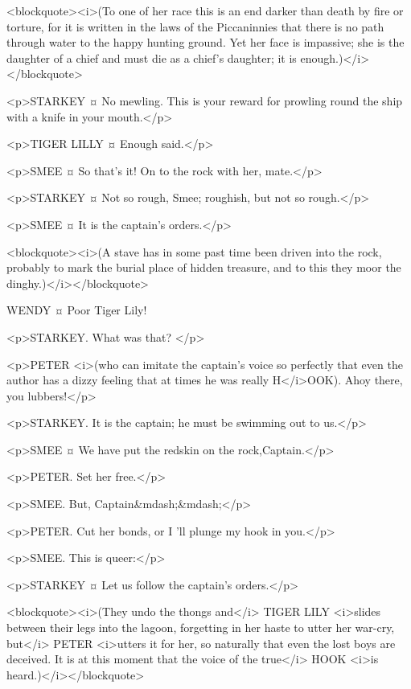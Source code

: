 <blockquote><i>(To one of her race this is an end darker than death by fire or torture, for it is written in the laws of the Piccaninnies that there is no path through water to the happy hunting ground. Yet her face is impassive; she is the daughter of a chief and must die as a chief's daughter; it is enough.)</i></blockquote>

<p>STARKEY ¤
No mewling. This is your reward for prowling round the ship with a knife in your mouth.</p>

<p>TIGER LILLY ¤
Enough said.</p>

<p>SMEE ¤
So that's it! On to the rock with her, mate.</p>

<p>STARKEY ¤
Not so rough, Smee; roughish, but not so rough.</p>

<p>SMEE ¤
It is the captain's orders.</p>

<blockquote><i>(A stave has in some past time been driven into the rock, probably to mark the burial place of hidden treasure, and to this they moor the dinghy.)</i></blockquote>

WENDY ¤
Poor Tiger Lily! 

<p>STARKEY. What was that?
</p>

<p>PETER <i>(who can imitate the captain's voice so perfectly that even the author has a dizzy feeling that at times he was really H</i>OOK). Ahoy there, you lubbers!</p>

<p>STARKEY. It is the captain; he must be swimming out to us.</p>

<p>SMEE ¤
We have put the redskin on the rock,Captain.</p>

<p>PETER. Set her free.</p>

<p>SMEE. But, Captain&mdash;&mdash;</p>

<p>PETER. Cut her bonds, or I 'll plunge my hook in you.</p>

<p>SMEE. This is queer:</p>

<p>STARKEY ¤
Let us follow the captain's orders.</p>

<blockquote><i>(They undo the thongs and</i> TIGER LILY <i>slides between their legs into the lagoon, forgetting in her haste to utter her war-cry, but</i> PETER <i>utters it for her, so naturally that even the lost boys are deceived. It is at this moment that the voice of the true</i> HOOK <i>is heard.)</i></blockquote>

